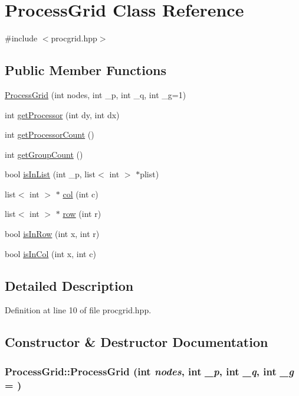 \hypertarget{class_process_grid}{
\section{ProcessGrid Class Reference}
\label{class_process_grid}
}


{\ttfamily \#include $<$procgrid.hpp$>$}\subsection*{Public Member Functions}
\begin{DoxyCompactItemize}
\item 
\hyperlink{class_process_grid_a1de41374db255e74fd5d26bdd09744bd}{ProcessGrid} (int nodes, int \_\-p, int \_\-q, int \_\-g=1)
\item 
int \hyperlink{class_process_grid_a26a8d106c761c8989309b8ca4fed0e7a}{getProcessor} (int dy, int dx)
\item 
int \hyperlink{class_process_grid_aba5b11a3a2274d287d46785b8752ac73}{getProcessorCount} ()
\item 
int \hyperlink{class_process_grid_ab33a60ab0d012f1c36d8a8f8f631d89c}{getGroupCount} ()
\item 
bool \hyperlink{class_process_grid_a37c4a3beb6bc5468816e1ec8df99f8d7}{isInList} (int \_\-p, list$<$ int $>$ $\ast$plist)
\item 
list$<$ int $>$ $\ast$ \hyperlink{class_process_grid_af3a44653f3cfacc1ddaa6e8eb58c2d65}{col} (int c)
\item 
list$<$ int $>$ $\ast$ \hyperlink{class_process_grid_a2525f9b6d7307f6ca3d1db558e934550}{row} (int r)
\item 
bool \hyperlink{class_process_grid_afde8841687dc3c3a11c2c0a70104a512}{isInRow} (int x, int r)
\item 
bool \hyperlink{class_process_grid_ab8954e1d54e14023558d57dc2f84953c}{isInCol} (int x, int c)
\end{DoxyCompactItemize}


\subsection{Detailed Description}


Definition at line 10 of file procgrid.hpp.

\subsection{Constructor \& Destructor Documentation}
\hypertarget{class_process_grid_a1de41374db255e74fd5d26bdd09744bd}{
\subsubsection[{ProcessGrid}]{\setlength{\rightskip}{0pt plus 5cm}ProcessGrid::ProcessGrid (int {\em nodes}, \/  int {\em \_\-p}, \/  int {\em \_\-q}, \/  int {\em \_\-g} = {})}}
\label{class_process_grid_a1de41374db255e74fd5d26bdd09744bd}


